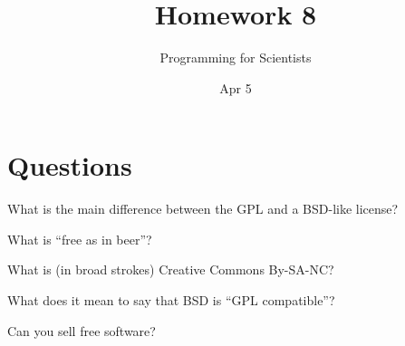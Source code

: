 
\author{Programming for Scientists}
\title{Homework 8}
\date{Apr 5}

\maketitle

\chapter{Questions}

\question
What is the main difference between the GPL and a BSD-like license?

\question
What is ``free as in beer''?

\question
What is (in broad strokes) Creative Commons By-SA-NC?

\question
What does it mean to say that BSD is ``GPL compatible''?

\question
Can you sell free software?



